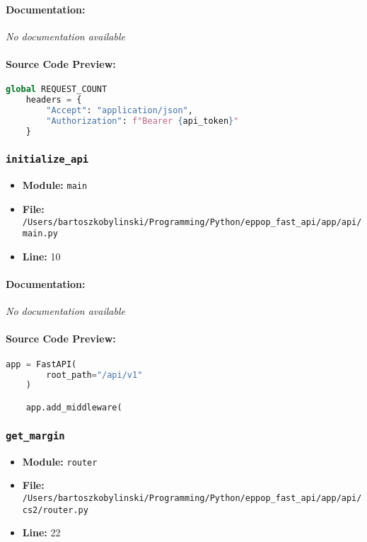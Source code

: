 \documentclass[11pt,a4paper]{article}
\begin{document}
\paragraph{Documentation:} \textit{No documentation available}

\paragraph{Source Code Preview:}
\begin{lstlisting}[language=Python]
    global REQUEST_COUNT
    headers = {
        "Accept": "application/json",
        "Authorization": f"Bearer {api_token}"
    }
\end{lstlisting}

\vspace{1em}
\subsubsection{\texttt{initialize\_api}}

\begin{itemize}
    \item \textbf{Module:} \texttt{main}
    \item \textbf{File:} \texttt{/Users/bartoszkobylinski/Programming/Python/eppop\_fast\_api/app/api/main.py}
    \item \textbf{Line:} 10
\end{itemize}

\paragraph{Documentation:} \textit{No documentation available}

\paragraph{Source Code Preview:}
\begin{lstlisting}[language=Python]
    app = FastAPI(
        root_path="/api/v1"
    )

    app.add_middleware(
\end{lstlisting}

\vspace{1em}
\subsubsection{\texttt{get\_margin}}

\begin{itemize}
    \item \textbf{Module:} \texttt{router}
    \item \textbf{File:} \texttt{/Users/bartoszkobylinski/Programming/Python/eppop\_fast\_api/app/api/cs2/router.py}
    \item \textbf{Line:} 22
\end{itemize}
\end{document}
